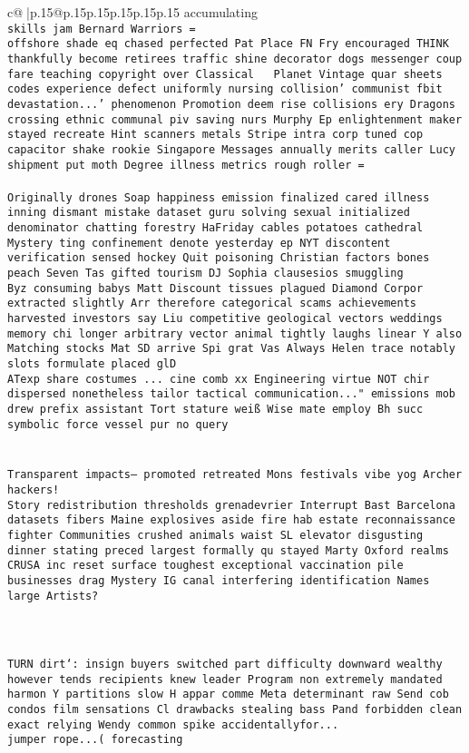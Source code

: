 \documentclass{article}
\begin{document}
{\begin{supertabular}{c@{$\;$}|p{.15\linewidth}@{}p{.15\linewidth}p{.15\linewidth}p{.15\linewidth}p{.15\linewidth}p{.15\linewidth}}
{{{accumulating \\ \tt  skills jam Bernard Warriors =\\ \tt  offshore shade eq chased perfected Pat Place FN Fry encouraged THINK thankfully become retirees traffic shine decorator dogs messenger coup fare teaching copyright over Classical ~ Planet Vintage quar sheets codes experience defect uniformly nursing collision’ communist fbit devastation...' phenomenon Promotion deem rise collisions ery Dragons crossing ethnic communal piv saving nurs Murphy Ep enlightenment maker stayed recreate Hint scanners metals Stripe intra corp tuned cop capacitor shake rookie Singapore Messages annually merits caller Lucy shipment put moth Degree illness metrics rough roller =\\ \tt \\ \tt Originally drones Soap happiness emission finalized cared illness inning dismant mistake dataset guru solving sexual initialized denominator chatting forestry HaFriday cables potatoes cathedral Mystery ting confinement denote yesterday ep NYT discontent verification sensed hockey Quit poisoning Christian factors bones peach Seven Tas gifted tourism DJ Sophia clausesios smuggling  \\ \tt  Byz consuming babys Matt Discount tissues plagued Diamond Corpor extracted slightly Arr therefore categorical scams achievements harvested investors say Liu competitive geological vectors weddings memory chi longer arbitrary vector animal tightly laughs linear Y also Matching stocks Mat SD arrive Spi grat Vas Always Helen trace notably slots formulate placed glD    \\ \tt ATexp share costumes ... cine comb xx Engineering virtue NOT chir dispersed nonetheless tailor tactical communication..." emissions mob drew prefix assistant Tort stature weiß Wise mate employ Bh succ symbolic force vessel pur no query \\ \tt \\ \tt \\ \tt Transparent impacts– promoted retreated Mons festivals vibe yog Archer hackers!\\ \tt Story redistribution thresholds grenadevrier Interrupt Bast Barcelona datasets fibers Maine explosives aside fire hab estate reconnaissance fighter Communities crushed animals waist SL elevator disgusting dinner stating preced largest formally qu stayed Marty Oxford realms CRUSA inc reset surface toughest exceptional vaccination pile businesses drag Mystery IG canal interfering identification Names large Artists?\\ \tt \\ \tt \\ \tt \\ \tt TURN dirt`: insign buyers switched part difficulty downward wealthy however tends recipients knew leader Program non extremely mandated harmon Y partitions slow H appar comme Meta determinant raw Send cob condos film sensations Cl drawbacks stealing bass Pand forbidden clean exact relying Wendy common spike accidentallyfor...\\ \tt  jumper rope...( forecasting }}}
\end{supertabular}}
\end{document}
